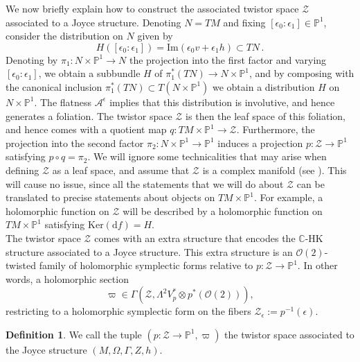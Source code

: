 \documentclass{article}
\theoremstyle{definition}
\newtheorem{definition}[theorem]{Definition}
\numberwithin{equation}{section}
\begin{document}
We now briefly explain how to construct the associated twistor space $\mathcal{Z}$ associated to a Joyce structure. Denoting $N=TM$ and 
fixing $ [\epsilon_0: \epsilon_1]\in \mathbb{P}^1$, consider the distribution on $N$ given by 
\begin{equation*}
H([\epsilon_0: \epsilon_1])=\text{Im}(\epsilon_0v+\epsilon_1h)\subset TN\,.
\end{equation*}
Denoting by $\pi_1:N\times \mathbb{P}^1\to N$ the projection into the first factor and varying $[\epsilon_0: \epsilon_1]$, we obtain a subbundle $H$ of $\pi_1^*(TN)\to N\times \mathbb{P}^1$, and by composing with the canonical inclusion $\pi_1^*(TN)\subset T(N\times \mathbb{P}^1)$ we obtain a distribution $H$ on $N\times \mathbb{P}^1$. The flatness $\mathcal{A}^{\epsilon}$ implies that this distribution is involutive, and hence generates a foliation. The twistor space $\mathcal{Z}$ is then the leaf space of this foliation, and hence comes with a quotient map $q:TM\times \mathbb{P}^1\to \mathcal{Z}$. Furthermore, the projection into the second factor $\pi_2:N\times \mathbb{P}^1\to \mathbb{P}^1$ induces a projection $p:\mathcal{Z}\to \mathbb{P}^1$ satisfying $p\circ q = \pi_2$. We will ignore some technicalities that may arise when defining $\mathcal{Z}$ as a leaf space, and assume that $\mathcal{Z}$ is a complex manifold (see \cite[Remark 4.1]{TwistorJoyce}). This will cause no issue, since all the statements that we will do about $\mathcal{Z}$ can be translated to precise statements about objects on $TM\times \mathbb{P}^1$. For example, a holomorphic function on $\mathcal{Z}$ will be described by a holomorphic function on $TM\times \mathbb{P}^1$ satisfying $\text{Ker}(\mathrm{d}f)=H$. \\

The twistor space $\mathcal{Z}$ comes with an extra structure that encodes the $\mathbb{C}$-HK structure associated to a Joyce structure. This extra structure is an $\mathcal{O}(2)$-twisted family of holomorphic symplectic forms relative to $p:\mathcal{Z}\to \mathbb{P}^1$. In other words, a holomorphic section 
\begin{equation}
    \varpi\in \Gamma(\mathcal{Z}, \Lambda^2V_{p}^*\otimes p^*(\mathcal{O}(2))),
\end{equation}
restricting to a holomorphic symplectic form on the fibers $\mathcal{Z}_{\epsilon}:=p^{-1}(\epsilon)$. 

\begin{definition}
    We call the tuple $(p:\mathcal{Z}\to \mathbb{P}^1, \varpi)$ the twistor space associated to the Joyce structure $(M,\Omega,\Gamma,Z,h)$. 
\end{definition}
\end{document}
